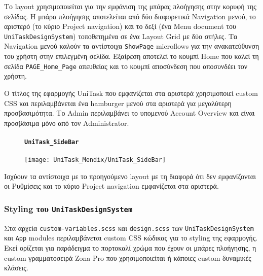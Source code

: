                 Το layout χρησιμοποιείται για την εμφάνιση της μπάρας πλοήγησης στην κορυφή της σελίδας. Η μπάρα πλοήγησης αποτελείται από δύο διαφορετικά Navigation μενού, το αριστερό (το κύριο Project navigation) και το δεξί (ένα Menu document του \texttt{UniTaskDesignSystem}) τοποθετημένα σε ένα Layout Grid με δύο στήλες. Τα Navigation μενού καλούν τα αντίστοιχα \texttt{ShowPage} microflows για την ανακατεύθυνση του χρήστη στην επιλεγμένη σελίδα. Εξαίρεση αποτελεί το κουμπί {\Zona Home} που καλεί τη σελίδα \texttt{PAGE\_Home\_Page} απευθείας και το κουμπί {\Zonaa αποσύνδεση} που αποσυνδέει τον χρήστη.

                Ο τίτλος της εφαρμογής {\ZonaSB UniTask} που εμφανίζεται στα αριστερά χρησιμοποιεί custom CSS και περιλαμβάνεται ένα hamburger μενού στα αριστερά για μεγαλύτερη προσβασιμότητα. Το {\Zone Admin} περιλαμβάνει το υπομενού {\Zona Account Overview} και είναι προσβάσιμα μόνο από τον Administrator.

                \begin{figure}[H] \noindent
                    \paragraph{\texttt{UniTask\_SideBar}}
                    \begin{center}
                        \texttt{[image: UniTask\_Mendix/UniTask\_SideBar]}
                    \end{center}
                \end{figure}\textbf{}

                Ισχύουν τα αντίστοιχα με το προηγούμενο layout με τη διαφορά ότι δεν εμφανίζονται οι Ρυθμίσεις και το κύριο Project navigation εμφανίζεται στα αριστερά.

            \subsubsection{Styling του \texttt{UniTaskDesignSystem}}
                Στα αρχεία \texttt{custom-variables.scss} και \texttt{design.scss} των \texttt{UniTaskDesignSystem} και \texttt{App} modules περιλαμβάνεται custom CSS κώδικας για το styling της εφαρμογής. Εκεί ορίζεται για παράδειγμα το πορτοκαλί χρώμα που έχουν οι μπάρες πλοήγησης, η custom γραμματοσειρά Zona Pro που χρησιμοποιείται ή κάποιες custom δυναμικές κλάσεις.